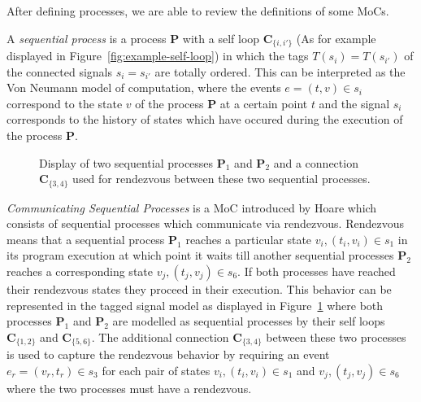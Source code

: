 After defining processes, we are able to review the definitions of some MoCs.

A \emph{sequential process} is a process $\mathbf{P}$ with a self loop $\mathbf{C}_{\{i,i'\}}$
(As for example displayed in Figure~\ref{fig:example-self-loop}) in which
the tags $T(s_i) = T(s_{i'})$ of the connected signals $s_i = s_{i'}$ are totally ordered.
This can be interpreted as the Von Neumann model of computation, where the
events $e = (t,v) \in s_i$ correspond to the state $v$ of the process $\mathbf{P}$ at a certain
point $t$ and the signal $s_i$ corresponds to the history of states which
have occured during the execution of the process $\mathbf{P}$.

\begin{figure}[htb]
\centering

\caption{\label{fig:example-csp-tsm}
  Display of two sequential processes $\mathbf{P}_1$ and $\mathbf{P}_2$
  and a connection $\mathbf{C}_{\{3,4\}}$ used for rendezvous
  between these two sequential processes.}
\end{figure}

\emph{Communicating Sequential Processes} is a MoC introduced by Hoare
\cite{csphoare:1985} which consists of sequential processes which communicate
via rendezvous. Rendezvous means that a sequential process $\mathbf{P}_1$
reaches a particular state $v_i, (t_i,v_i) \in s_1$ in its program execution
at which point it waits till another sequential processes $\mathbf{P}_2$
reaches a corresponding state $v_j, (t_j,v_j) \in s_6$. If both processes
have reached their rendezvous states they proceed in their execution. This
behavior can be represented in the tagged signal model as displayed in
Figure~\ref{fig:example-csp-tsm} where both processes $\mathbf{P}_1$ and
$\mathbf{P}_2$ are modelled as sequential processes by their self loops
$\mathbf{C}_{\{1,2\}}$ and $\mathbf{C}_{\{5,6\}}$. The additional connection
$\mathbf{C}_{\{3,4\}}$ between these two processes is used to capture the
rendezvous behavior by requiring an event $e_r = (v_r,t_r) \in s_3$ for
each pair of states $v_i, (t_i,v_i) \in s_1$ and $v_j, (t_j,v_j) \in s_6$
where the two processes must have a rendezvous.


